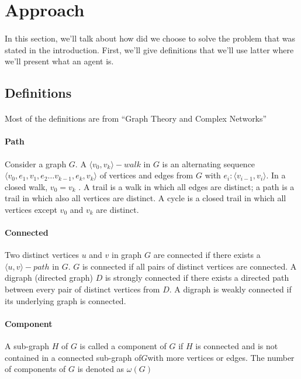 \documentclass{article}
\begin{document}
\newpage
\section{Approach}
	\paragraph{}
		In this section, we'll talk about how did we choose to solve the problem that was stated in the introduction.
		First, we'll give definitions that we'll use latter where we'll present what an agent is.
	\subsection{Definitions}
		\paragraph{}
			Most of the definitions are from ``Graph Theory and Complex Networks''\cite{Steen10}
		\paragraph{Path}
			Consider a graph $G$.
			A $\langle v_0 , v_k\rangle-walk$ in $G$ is an alternating sequence $\langle v_0 , e_1 , v_1 , e_2 \dots
			v_{k-1} , e_k , v_k \rangle$ of vertices
			and edges from $G$ with $e_i : \langle v_{i-1},v_i \rangle$.
			In a closed walk, $v_0 = v_k$ .
			A trail is a walk in which all edges are distinct; a path is a trail in which also all vertices are distinct.
			A cycle is a closed trail in which all vertices except $v_0$ and $v_k$ are distinct.
		\paragraph{Connected}
			Two distinct vertices $u$ and $v$ in graph $G$ are connected if there exists a $\langle u, v \rangle - path$ in $G$.
			$G$ is connected if all pairs of distinct vertices are connected.
			A digraph (directed graph) $D$ is strongly connected if there exists
			a directed path between every pair of distinct vertices from $D$.
			A digraph is weakly connected if its underlying graph is connected.
		\paragraph{Component}
			A sub-graph $H$ of $G$ is called a component of $G$ if $H$ is connected
			and is not contained in a connected sub-graph of$G$with more vertices or edges.
			The number of components of $G$ is denoted as $\omega(G)$
\end{document}
